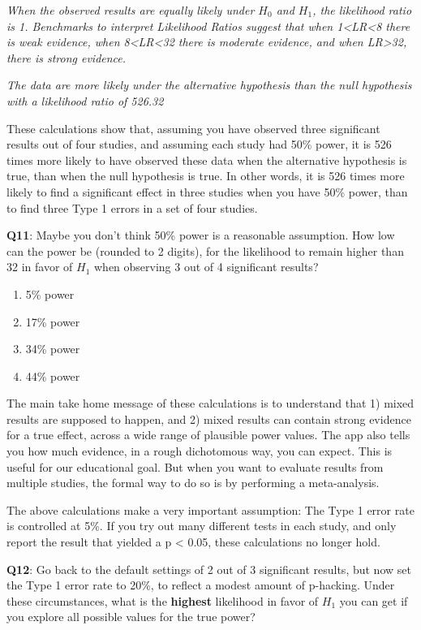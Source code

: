 \documentclass[
  oneside]{book}
\providecommand{\tightlist}{%
  \setlength{\itemsep}{0pt}\setlength{\parskip}{0pt}}
\begin{document}
\emph{When the observed results are equally likely under \(H_0\) and \(H_1\), the likelihood ratio is 1. Benchmarks to interpret Likelihood Ratios suggest that when 1\textless LR\textless8 there is weak evidence, when 8\textless LR\textless32 there is moderate evidence, and when LR\textgreater32, there is strong evidence.}

\emph{The data are more likely under the alternative hypothesis than the null hypothesis with a likelihood ratio of 526.32}

These calculations show that, assuming you have observed three significant results out of four studies, and assuming each study had 50\% power, it is 526 times more likely to have observed these data when the alternative hypothesis is true, than when the null hypothesis is true. In other words, it is 526 times more likely to find a significant effect in three studies when you have 50\% power, than to find three Type 1 errors in a set of four studies.

\textbf{Q11}: Maybe you don't think 50\% power is a reasonable assumption. How low can the power be (rounded to 2 digits), for the likelihood to remain higher than 32 in favor of \(H_1\) when observing 3 out of 4 significant results?

\begin{enumerate}
\def\labelenumi{\Alph{enumi})}
\tightlist
\item
  5\% power
\item
  17\% power
\item
  34\% power
\item
  44\% power
\end{enumerate}

The main take home message of these calculations is to understand that 1) mixed results are supposed to happen, and 2) mixed results can contain strong evidence for a true effect, across a wide range of plausible power values. The app also tells you how much evidence, in a rough dichotomous way, you can expect. This is useful for our educational goal. But when you want to evaluate results from multiple studies, the formal way to do so is by performing a meta-analysis.

The above calculations make a very important assumption: The Type 1 error rate is controlled at 5\%. If you try out many different tests in each study, and only report the result that yielded a p \textless{} 0.05, these calculations no longer hold.

\textbf{Q12}: Go back to the default settings of 2 out of 3 significant results, but now set the Type 1 error rate to 20\%, to reflect a modest amount of p-hacking. Under these circumstances, what is the \textbf{highest} likelihood in favor of \(H_1\) you can get if you explore all possible values for the true power?
\end{document}
